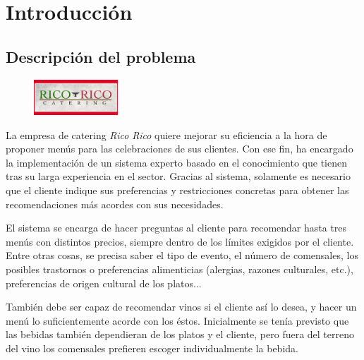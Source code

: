 % 

\section{Introducción}
\subsection{Descripción del problema}

\begin{figure}
  \vspace{-20pt}
  \begin{center}
    \includegraphics[width=0.28\textwidth]{figures/ricorico}
  \end{center}
  \vspace{-20pt}
\end{figure}

La empresa de catering \emph{Rico Rico} quiere mejorar su eficiencia a la hora
de proponer menús para las celebraciones de sus clientes. Con ese fin, ha
encargado la implementación de un sistema experto basado en el conocimiento que
tienen tras su larga experiencia en el sector. Gracias al sistema, solamente es
necesario que el cliente indique sus preferencias y restricciones concretas
para obtener las recomendaciones más acordes con sus necesidades.

El sistema se encarga de hacer preguntas al cliente para recomendar hasta tres
menús con distintos precios, siempre dentro de los límites exigidos por el
cliente. Entre otras cosas, se precisa saber el tipo de evento, el número de
comensales, los posibles trastornos o preferencias alimenticias (alergias,
razones culturales, etc.), preferencias de origen cultural de los platos...

También debe ser capaz de recomendar vinos si el cliente así lo desea, y hacer
un menú lo suficientemente acorde con los éstos. Inicialmente se tenía previsto
que las bebidas también dependieran de los platos y el cliente, pero fuera del
terreno del vino los comensales prefieren escoger individualmente la bebida.
